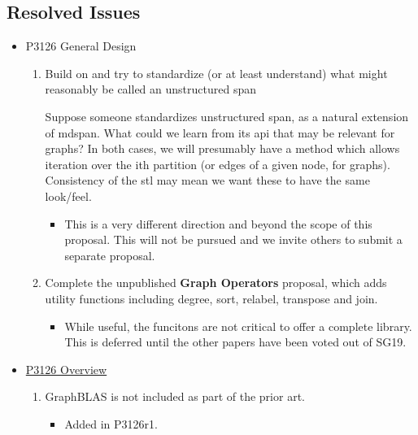 \subsection{Resolved Issues}
\begin{itemize}
      \item P3126 General Design
            \begin{enumerate}
                  \item Build on  and try to standardize (or at least understand) what might reasonably be called an unstructured span
                              
                  Suppose someone standardizes unstructured span, as a natural extension of mdspan. What could we 
                  learn from its api that may be relevant for graphs? In both cases, we will presumably have a method which allows iteration over the ith partition 
                  (or edges of a given node, for graphs). Consistency of the stl may mean we want these to have the same look/feel.
                  \begin{itemize}
                        \item This is a very different direction and beyond the scope of this proposal. This will not be pursued
                              and we invite others to submit a separate proposal.
                  \end{itemize}
            \item Complete the unpublished \textbf{Graph Operators} proposal, which adds utility functions including degree, sort, relabel, transpose and join.
                  \begin{itemize}
                        \item While useful, the funcitons are not critical to offer a complete library. This is deferred until the other papers 
                              have been voted out of SG19.
                  \end{itemize}
            \end{enumerate}
      \item \href{https://www.wg21.link/P3126}{P3126 Overview}
            \begin{enumerate}
                  \item GraphBLAS is not included as part of the prior art.
                        \begin{itemize}
                              \item Added in P3126r1.
                        \end{itemize}

\end{enumerate}
\end{itemize}
